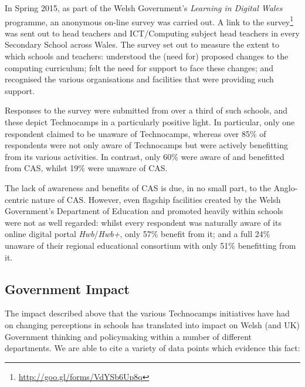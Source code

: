 In Spring 2015, as part of the Welsh Government's
\emph{Learning in Digital Wales} programme,
an anonymous on-line survey was carried out.
A link to the survey\footnote{\url{http://goo.gl/forms/VdYSb6Up8q}}
was sent out to head teachers and ICT/Computing subject head teachers
in every Secondary School across Wales.
The survey set out to measure the extent to which schools and teachers:
understood the (need for) proposed changes to the computing curriculum;
felt the need for support to face these changes;
and recognised the various organisations and facilities that were
providing such support.

Responses to the survey were submitted from over a third of such schools,
and these depict Technocamps in a particularly positive light.
In particular, only one respondent claimed to be unaware of Technocamps,
whereas over 85\% of respondents were not only aware of Technocamps
but were actively benefitting from its various activities.
In contrast, only 60\% were aware of and benefitted from CAS,
whilst 19\% were unaware of CAS.

The lack of awareness and benefits of CAS is due, in no small part, to
the Anglo-centric nature of CAS.  However, even flagship facilities
created by the Welsh Government's Department of Education and promoted
heavily within schools were not as well regarded: whilst every
respondent was naturally aware of its online digital portal
{\emph{Hwb}}/{\emph{Hwb+}}, only 57\% benefit from it; and a full 24\%
unaware of their regional educational consortium with only 51\%
benefitting from it.

\subsection{Government Impact}\label{govrecog}

The impact described above that the various Technocamps initiatives
have had on changing perceptions in schools has translated into impact
on Welsh (and UK) Government thinking and policymaking within a number
of different departments. We are able to cite a variety of data points
which evidence this fact:

